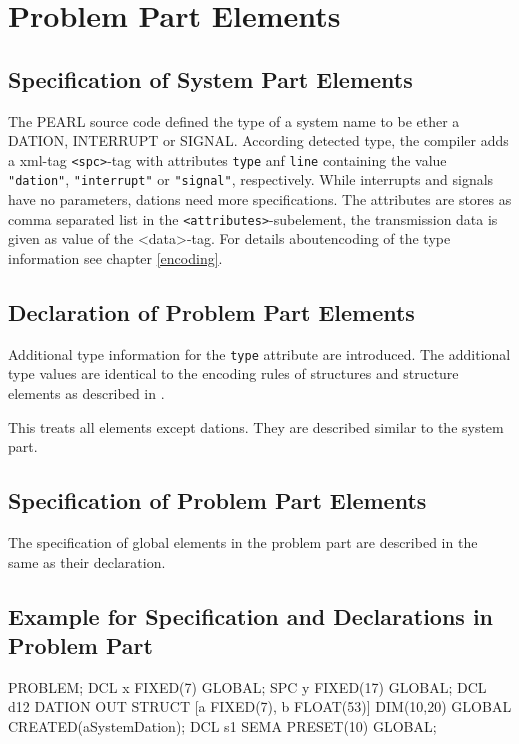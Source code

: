 \section{Problem Part Elements}
\subsection{Specification of System Part Elements}
The PEARL source code defined the type of a system name to be ether a DATION, 
INTERRUPT or SIGNAL. According detected type, the compiler 
adds a xml-tag \verb|<spc>|-tag with attributes \verb|type| anf \verb|line|
containing the value \verb|"dation"|, \verb|"interrupt"| or \verb|"signal"|,
 respectively.
While interrupts and signals have no parameters, dations need more
specifications. The attributes are stores as comma separated list in the
\verb|<attributes>|-subelement, the transmission data is given as value
of the <data>-tag. For details aboutencoding of the type information
see chapter \ref{encoding}. 

\subsection{Declaration of Problem Part Elements}

Additional type information for the \verb|type| attribute are introduced.
The additional type values are identical to the  encoding rules of
structures and structure elements  as described in \cite{runtime}.

This treats all elements except dations. They are described similar to the
system part.


\subsection{Specification of Problem Part Elements}
The specification of global  elements in the problem part are described 
in the same as their declaration.

\subsection{Example for Specification and Declarations in Problem Part}

\begin{PEARLCode}
PROBLEM;
   DCL x FIXED(7) GLOBAL;
   SPC y FIXED(17) GLOBAL;
   DCL d12 DATION OUT STRUCT [a FIXED(7), b FLOAT(53)]
     DIM(10,20)  GLOBAL CREATED(aSystemDation);
   DCL s1 SEMA PRESET(10) GLOBAL;
\end{PEARLCode}

